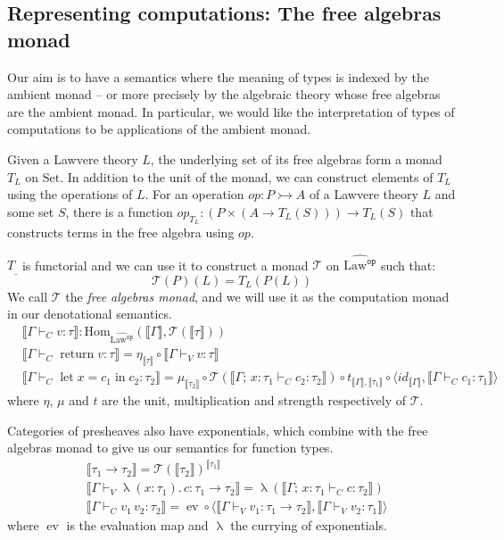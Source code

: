 \documentclass[acmsmall, screen, review, anonymous]{acmart}
\theoremstyle{definition}
\newcommand{\setc}{\mathrm{Set}}
\newcommand{\lawc}{\mathrm{Law}}
\newcommand{\lawcop}{\lawc^{\mathtt{op}}}
\newcommand{\pshlawcop}{\widehat{\lawcop}}
\newcommand{\homset}[3]{\mathrm{Hom}_{#1}(#2, #3)}
\newcommand{\arrow}[2]{{#2}^{#1}}
\newcommand{\sem}[1]{\llbracket #1 \rrbracket}
\newcommand{\mon}{\mathcal{T}}
\newcommand{\abs}[3]{\mathop{\lambda}(#1 \types #2).\,#3}
\newcommand{\app}[2]{#1\,#2}
\newcommand{\types}{\mathrel{:}}
\newcommand{\ccons}[2]{#1;\,#2}
\newcommand{\lbind}[3]{\ccons{#1}{#2\types#3}}
\newcommand{\return}[1]{\mathop{\mathrm{return}} #1}
\newcommand{\letv}[3]{\mathop{\mathrm{let}} #1 = #2 \mathop{\mathrm{in}} #3}
\newcommand{\turnv}{\mathrel{\vdash_V}}
\newcommand{\turnc}{\mathrel{\vdash_C}}
\newcommand{\evmap}{\mathop{ev}}
\newcommand{\currymap}{\mathop{\lambda}}
\begin{document}
\subsection{Representing computations: The free algebras monad}

Our aim is to have a semantics where the meaning of types is indexed by
the ambient monad -- or more precisely by the algebraic theory whose
free algebras are the ambient monad. In particular, we would like the
interpretation of types of computations to be applications of the
ambient monad.

Given a Lawvere theory $L$, the underlying set of its free algebras form
a monad $T_L$ on $\setc$. In addition to the unit of the monad, we can
construct elements of $T_L$ using the operations of $L$. For an
operation $op \types P \rightarrowtail A$ of a Lawvere theory $L$ and
some set $S$, there is a function
$op_{T_L} \types (P \times (A \rightarrow T_L(S))) \rightarrow T_L(S)$
that constructs terms in the free algebra using $op$.

$T_{\_}$ is functorial and we can use it to construct a monad $\mon$ on
$\pshlawcop$ such that:
\begin{equation*}
\mon(P)(L) = T_L(P(L))
\end{equation*}
We call $\mon$ the \emph{free algebras monad}, and we will use it as the
computation monad in our denotational semantics.
\begin{align*}
  &\sem{\Gamma \turnc v \types \tau} \mathrel{:}
    \homset{\pshlawcop}{\sem{\Gamma}}{\mon(\sem{\tau})} \\
  &\sem{\Gamma \turnc \return{v} \types \tau} =
    \eta_{\sem{\tau}} \circ \sem{\Gamma \turnv v \types \tau} \\
  &\sem{\Gamma \turnc \letv{x}{c_1}{c_2} \types \tau_2} =
    \mu_{\sem{\tau_2}}
    \circ \mon(\sem{\lbind{\Gamma}{x}{\tau_1} \turnc c_2 \types \tau_2})
    \circ t_{\sem{\Gamma}, \sem{\tau_1}}
    \circ \langle id_{\sem{\Gamma}}, \sem{\Gamma \turnc c_1 \types \tau_1} \rangle
\end{align*}
where $\eta$, $\mu$ and $t$ are the unit, multiplication and strength
respectively of $\mon$.

Categories of presheaves also have exponentials, which combine with the
free algebras monad to give us our semantics for function types.
\begin{align*}
  &\sem{\tau_1 \rightarrow \tau_2} = \arrow{\sem{\tau_1}}{\mon(\sem{\tau_2})} \\
  &\sem{\Gamma \turnv \abs{x}{\tau_1}{c} \types \tau_1 \rightarrow \tau_2} =
    \currymap(\sem{\lbind{\Gamma}{x}{\tau_1} \turnc c \types \tau_2})
     \\
  &\sem{\Gamma \turnc \app{v_1}{v_2} \types \tau_2} =
    \evmap
    \circ \langle \sem{\Gamma \turnv v_1 \types \tau_1 \rightarrow \tau_2},
                  \sem{\Gamma \turnv v_2 \types \tau_1} \rangle
\end{align*}
where $\evmap$ is the evaluation map and $\currymap$ the currying of
exponentials.
\end{document}
